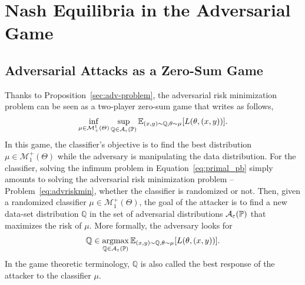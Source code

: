 

\section{Nash Equilibria in the Adversarial Game}
\label{sec:nash-eq}

\subsection{Adversarial Attacks as a Zero-Sum Game}

Thanks to Proposition~\ref{sec:adv-problem}, the adversarial risk minimization problem can  be seen as a two-player zero-sum game that writes as follows,
\begin{align}
    \inf_{\mu\in\mathcal{M}^1_+(\Theta)} \sup_{\QQ\in\mathcal{A}_{\varepsilon}(\PP)}\mathbb{E}_{(x,y)\sim\QQ,\theta\sim\mu}\left[\loss(\theta,(x,y))\right].
\label{eq:primal_pb}
\end{align}
In this game, the classifier's objective is to find the best distribution $\mu \in \mathcal{M}_1^+(\Theta)$ while the adversary is manipulating the data distribution. For the classifier, solving the infimum problem in Equation~\eqref{eq:primal_pb} simply amounts to solving the adversarial risk minimization problem -- Problem~\eqref{eq:advriskmin}, whether the classifier is randomized or not. Then, given a randomized classifier $\mu \in \mathcal{M}_1^+(\Theta)$, the goal of the attacker is to find a new data-set distribution $\mathbb{Q}$ in the set of adversarial distributions $\mathcal{A}_{\varepsilon}(\mathbb{P})$ that maximizes the risk of $\mu$. More formally, the adversary looks for $$\mathbb{Q} \in \argmaxB_{\QQ\in\mathcal{A}_{\varepsilon}(\PP)} \mathbb{E}_{(x,y)\sim\QQ,\theta\sim\mu}\left[\loss(\theta,(x,y))\right]. $$
In the game theoretic terminology, $\mathbb{Q}$ is also called the best response of the attacker to the classifier $\mu$.

